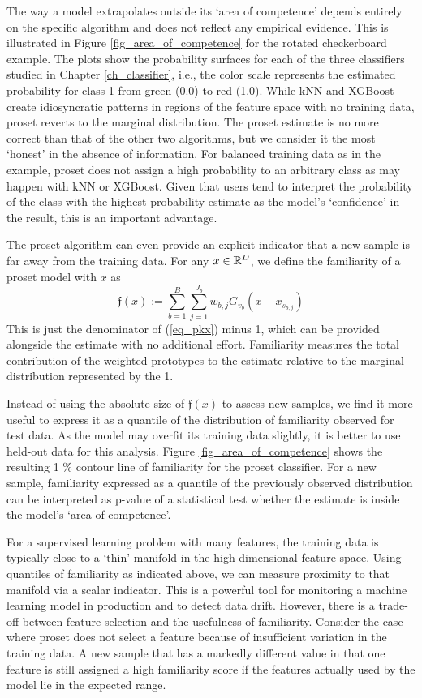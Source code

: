 The way a model extrapolates outside its `area of competence' depends entirely on the specific algorithm and does not reflect any empirical evidence.
This is illustrated in Figure \ref{fig_area_of_competence} for the rotated checkerboard example.
The plots show the probability surfaces for each of the three classifiers studied in Chapter \ref{ch_classifier}, i.e., the color scale represents the estimated probability for class 1 from green (0.0) to red (1.0).
While kNN and XGBoost create idiosyncratic patterns in regions of the feature space with no training data, proset reverts to the marginal distribution.
The proset estimate is no more correct than that of the other two algorithms, but we consider it the most `honest' in the absence of information.
For balanced training data as in the example, proset does not assign a high probability to an arbitrary class as may happen with kNN or XGBoost.
Given that users tend to interpret the probability of the class with the highest probability estimate as the model's `confidence' in the result, this is an important advantage.\par
%
The proset algorithm can even provide an explicit indicator that a new sample is far away from the training data.
For any $x\in\mathbb{R}^D$, we define the familiarity of a proset model with $x$ as
%
\begin{equation}
\mathfrak{f}(x):=\sum_{b=1}^B\sum_{j=1}^{J_b}w_{b,j}G_{v_b}(x-x_{s_{b,j}})\label{eq_familiarity}
\end{equation}
%
This is just the denominator of (\ref{eq_pkx}) minus 1, which can be provided alongside the estimate with no additional effort.
Familiarity measures the total contribution of the weighted prototypes to the estimate relative to the marginal distribution represented by the 1.\par
%
Instead of using the absolute size of $\mathfrak{f}(x)$ to assess new samples, we find it more useful to express it as a quantile of the distribution of familiarity observed for test data.
As the model may overfit its training data slightly, it is better to use held-out data for this analysis.
Figure \ref{fig_area_of_competence} shows the resulting 1 \% contour line of familiarity for the proset classifier.
For a new sample, familiarity expressed as a quantile of the previously observed distribution can be interpreted as p-value of a statistical test whether the estimate is inside the model's `area of competence'.\par
%
For a supervised learning problem with many features, the training data is typically close to a `thin' manifold in the high-dimensional feature space.
Using quantiles of familiarity as indicated above, we can measure proximity to that manifold via a scalar indicator.
This is a powerful tool for monitoring a machine learning model in production and to detect data drift.
However, there is a trade-off between feature selection and the usefulness of familiarity.
Consider the case where proset does not select a feature because of insufficient variation in the training data.
A new sample that has a markedly different value in that one feature is still assigned a high familiarity score if the features actually used by the model lie in the expected range.
%
